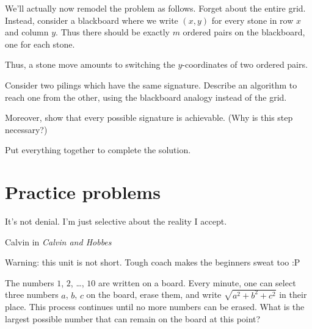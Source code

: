 \begin{walkthrough}
	We'll actually now remodel the problem as follows.
	Forget about the entire grid.
	Instead, consider a blackboard where we write $(x,y)$
	for every stone in row $x$ and column $y$.
	Thus there should be exactly $m$ ordered pairs
	on the blackboard, one for each stone.

	Thus, a stone move amounts to switching the $y$-coordinates
	of two ordered pairs.

	\begin{walk}[resume]
		\ii Consider two pilings which have the same signature.
		Describe an algorithm to reach one from the other,
		using the blackboard analogy instead of the grid.

		\ii Moreover, show that every possible signature is achievable.
		(Why is this step necessary?)

		\ii Put everything together to complete the solution.
	\end{walk}
\end{walkthrough}

\newpage

\section*{Practice problems}

\epigraph{It's not denial. I'm just selective about the reality I accept.}
{Calvin in \emph{Calvin and Hobbes}}
Warning: this unit is not short.
Tough coach makes the beginners sweat too :P

\begin{problem}
The numbers $1$, $2$, \dots, $10$ are written on a board.
Every minute, one can select three numbers
$a$, $b$, $c$ on the board, erase them,
and write $\sqrt{a^2+b^2+c^2}$ in their place.
This process continues until no more numbers can be erased.
What is the largest possible number
that can remain on the board at this point?
\end{problem} 



